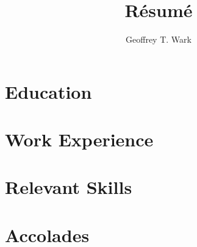 \documentclass{article}
\begin{document}
\title{R\'esum\'e}
\author{Geoffrey T. Wark}

\maketitle

\section{Education}

\section{Work Experience}

\section{Relevant Skills}

\section{Accolades}
\end{document}
